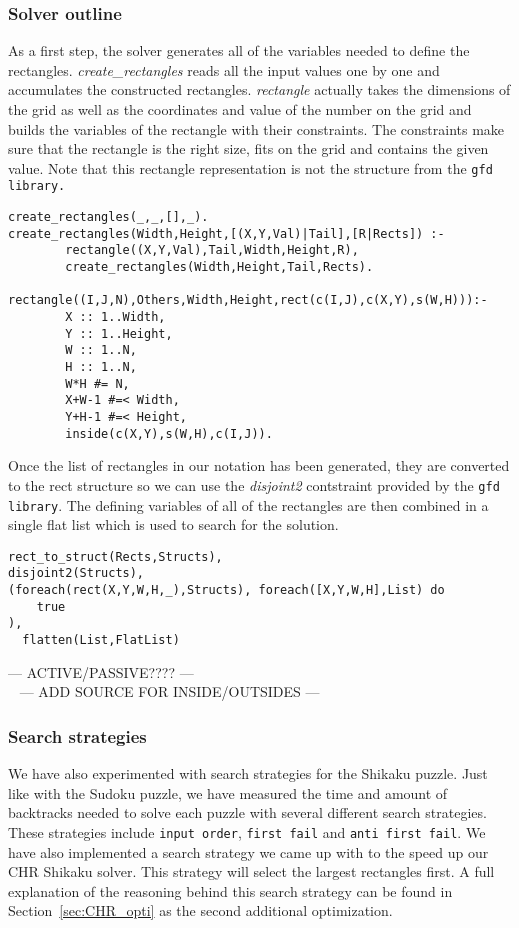 \subsubsection{Solver outline}
As a first step, the solver generates all of the variables needed to define the rectangles. \textsl{create\_rectangles} reads all the input values one by one and accumulates the constructed rectangles. \textsl{rectangle} actually takes the dimensions of the grid as well as the coordinates and value of the number on the grid and builds the variables of the rectangle with their constraints. The constraints make sure that the rectangle is the right size, fits on the grid and contains the given value. Note that this rectangle representation is not the structure from the \texttt{gfd library.}
\begin{lstlisting}
create_rectangles(_,_,[],_).
create_rectangles(Width,Height,[(X,Y,Val)|Tail],[R|Rects]) :-
        rectangle((X,Y,Val),Tail,Width,Height,R),
        create_rectangles(Width,Height,Tail,Rects).

rectangle((I,J,N),Others,Width,Height,rect(c(I,J),c(X,Y),s(W,H))):-
        X :: 1..Width,
        Y :: 1..Height,
        W :: 1..N,
        H :: 1..N,
        W*H #= N,
        X+W-1 #=< Width,
        Y+H-1 #=< Height,
        inside(c(X,Y),s(W,H),c(I,J)).
\end{lstlisting}

Once the list of rectangles in our notation has been generated, they are converted to the rect structure so we can use the \textsl{disjoint2} contstraint provided by the \texttt{gfd library}. The defining variables of all of the rectangles are then combined in a single flat list which is used to search for the solution.

\begin{lstlisting}
rect_to_struct(Rects,Structs),
disjoint2(Structs),
(foreach(rect(X,Y,W,H,_),Structs), foreach([X,Y,W,H],List) do
  	true
),
  flatten(List,FlatList)
\end{lstlisting}
--- ACTIVE/PASSIVE???? --- \\\
--- ADD SOURCE FOR INSIDE/OUTSIDES ---
\subsubsection{Search strategies}
We have also experimented with search strategies for the Shikaku puzzle. Just like with the Sudoku puzzle, we have measured the time and amount of backtracks needed to solve each puzzle with several different search strategies. These strategies include \texttt{input order}, \texttt{first fail} and \texttt{anti first fail}. We have also implemented a search strategy we came up with to the speed up our CHR Shikaku solver. This strategy will select the largest rectangles first. A full explanation of the reasoning behind this search strategy can be found in Section~\ref{sec:CHR_opti} as the second additional optimization.

